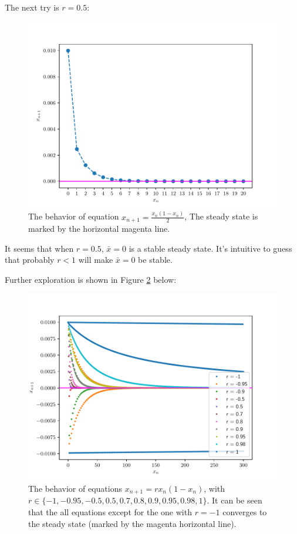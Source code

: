 \begin{homeworkProblem}[2]
\begin{enumerate}
The next try is $r=0.5$:
\begin{figure}
    \centering
    \caption[The behavior of equation $x_{n+1} = \frac{x_n(1-x_n)}{2}$]{
    The behavior of equation $x_{n+1} = \frac{x_n(1-x_n)}{2}$,
    The steady state is marked by the horizontal magenta line.}
    \label{fig:fig2a2}
    \includegraphics[scale=0.6]{../fig/fig2(a)(2).pdf}
\end{figure}
It seems that when $r = 0.5$, $\bar x = 0$ is a stable steady state. It's
intuitive to guess that probably $r < 1$ will make $\bar x = 0$ be stable.

\pagebreak

Further exploration is shown in Figure \ref{fig:fig2a3} below:
\begin{figure}
    \centering
    \caption[The behavior of equations $x_{n+1} = rx_n(1-x_n)$]{
    The behavior of equations $x_{n+1} = rx_n(1-x_n)$, with $r \in \{
        -1, -0.95, -0.5, 0.5, 0.7,0.8, 0.9, 0.95, 0.98, 1
    \}$. It can be seen that the all equations except for the one with $r = -1$
    converges to the steady state (marked by the magenta horizontal line).}
    \label{fig:fig2a3}
    \includegraphics[scale=0.6]{../fig/fig2(a)(3).pdf}
\end{figure}


\end{enumerate}
\end{homeworkProblem}
